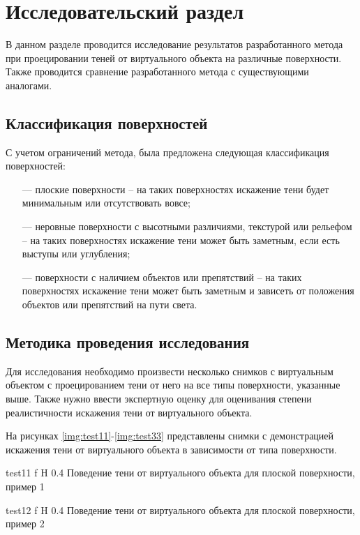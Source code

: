 \chapter{Исследовательский раздел}

В данном разделе проводится исследование результатов разработанного метода при проецировании теней от виртуального объекта на различные поверхности. Также проводится сравнение разработанного метода с существующими аналогами.

\section{Классификация поверхностей}

С учетом ограничений метода, была предложена следующая классификация поверхностей:

\begin{itemize}
	\item[---] плоские поверхности -- на таких поверхностях искажение тени будет минимальным или отсутствовать вовсе;
	\item[---] неровные поверхности с высотными различиями, текстурой или рельефом -- на таких поверхностях искажение тени может быть заметным, если есть выступы или углубления;
	\item[---] поверхности с наличием объектов или препятствий -- на таких поверхностях искажение тени может быть заметным и зависеть от положения объектов или препятствий на пути света.
\end{itemize}

\section{Методика проведения исследования}

Для исследования необходимо произвести несколько снимков с виртуальным объектом с проецированием тени от него на все типы поверхности, указанные выше. Также нужно ввести экспертную оценку для оценивания степени реалистичности искажения тени от виртуального объекта.

На рисунках \ref{img:test11}-\ref{img:test33} представлены снимки с демонстрацией искажения тени от виртуального объекта в зависимости от типа поверхности.

{test11}
{f}
{H}
{0.4\textwidth}
{Поведение тени от виртуального объекта для плоской поверхности, пример 1}

{test12}
{f}
{H}
{0.4\textwidth}
{Поведение тени от виртуального объекта для плоской поверхности, пример 2}

